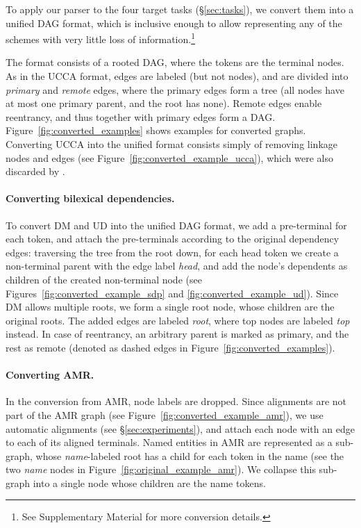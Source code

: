 \documentclass[11pt,a4paper]{article}
\begin{document}
To apply our parser to the four target tasks (\S\ref{sec:tasks}),
we convert them into a unified DAG format, which is inclusive enough to
allow representing any of the schemes with very little loss of information.\footnote{See
Supplementary Material for more conversion details.}

The format consists of a rooted DAG, where the tokens are the terminal nodes.
As in the UCCA format, edges are labeled (but not nodes),
and are divided into \textit{primary} and \textit{remote} edges,
where the primary edges form a tree (all nodes have at most one primary parent,
and the root has none).
Remote edges enable reentrancy, and thus together with primary edges
form a DAG.
Figure~\ref{fig:converted_examples} shows examples for converted graphs.
Converting UCCA into the unified format consists simply of removing linkage 
nodes and edges (see Figure~\ref{fig:converted_example_ucca}), which were
also discarded by \citet{hershcovich2017a}.

\paragraph{Converting bilexical dependencies.}
To convert DM and UD into the unified DAG format,
we add a pre-terminal for each token,
and attach the pre-terminals according to the original dependency edges:
traversing the tree from the root down, for each head token we create a non-terminal
parent with the edge label {\it head},
and add the node's dependents as children of the created non-terminal node
(see Figures~\ref{fig:converted_example_sdp} and \ref{fig:converted_example_ud}).
Since DM allows multiple roots, we form a single root node, whose children
are the original roots. The added edges are labeled \textit{root}, where
top nodes are labeled \textit{top} instead.
In case of reentrancy, an arbitrary parent is marked as primary, and the rest as remote
(denoted as dashed edges in Figure~\ref{fig:converted_examples}).

\paragraph{Converting AMR.}
In the conversion from AMR, node labels are dropped.
Since alignments are not part of the AMR graph (see Figure~\ref{fig:converted_example_amr}),
we use automatic alignments (see \S\ref{sec:experiments}),
and attach each node with an edge to each of its aligned terminals.
%
Named entities in AMR are represented as a sub-graph, whose \textit{name}-labeled root
has a child for each token in the name (see the two \textit{name} nodes in Figure~\ref{fig:original_example_amr}).
We collapse this sub-graph into a single node whose children are the name tokens.
\end{document}
